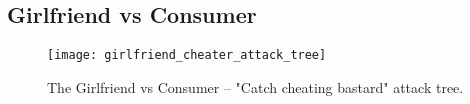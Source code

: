 \subsection{Girlfriend vs Consumer}

\begin{figure}
	\texttt{[image: girlfriend\_cheater\_attack\_tree]}
	\label{fig:attack_trees:girlfriend:cheater}
	\caption{The Girlfriend vs Consumer -- "Catch cheating bastard" attack tree.}
\end{figure}

